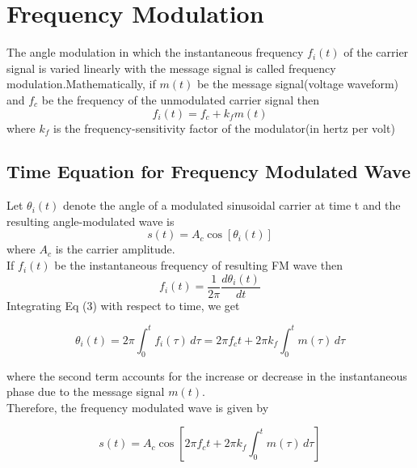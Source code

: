 \documentclass[12pt,a4paper]{article}%
\begin{document}
	\section{Frequency Modulation}
	\begin{flushleft}
	The angle modulation in which the instantaneous frequency $f_i(t)$ of the carrier signal is varied linearly with the message signal is called frequency modulation.Mathematically, if $m(t)$ be the message signal(voltage waveform) and $f_c$ be the frequency of the unmodulated carrier  signal then 
	\begin{equation} \label{eq:erl}
	f_i(t)=f_c+k_fm(t)
	\end{equation}
	where $k_f$ is the frequency-sensitivity factor of the modulator(in hertz per volt)
	\subsection{Time Equation for Frequency Modulated Wave}
	Let $\theta_i(t)$ denote the angle of a modulated sinusoidal carrier at time t and the resulting angle-modulated wave is 
	\begin{equation} \label{eq:erl}
	s(t)=A_c \cos{[\theta_i(t)]}
	\end{equation}
	where $A_c$ is the carrier amplitude.\\
	If $f_i(t)$ be the instantaneous frequency of resulting FM wave then 
	\begin{equation} \label{eq:erl}
	\displaystyle{f_i(t)= \frac{1}{2\pi}\frac{d\theta_i(t)}{dt}}
	\end{equation}
	Integrating Eq (3) with respect to time, we get
	
	
			$$\theta_i(t)= 2\pi \int_0^tf_i(\tau)\,d\tau=2\pi f_ct+2\pi k_f \int_0^tm(\tau)\,d\tau$$
			
	\begin{flushleft}
		where the second term accounts for the increase or decrease in the instantaneous phase due to the message signal $m(t)$.\\
		Therefore, the frequency modulated wave is given by
	\end{flushleft}
	$$s(t)=A_c \cos{[2\pi f_ct+2\pi k_f \int_0^tm(\tau)\,d\tau]}$$ 

\end{flushleft}
\end{document}
